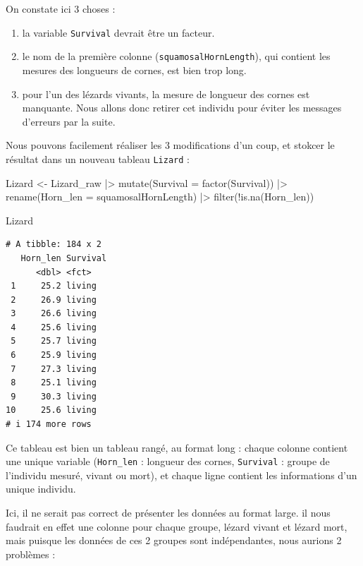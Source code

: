 \documentclass[
  french,
  a4paper,
  DIV=11,
  numbers=noendperiod,
  oneside]{scrreprt}
\newenvironment{Shaded}{}{}
\newcommand{\AttributeTok}[1]{\textcolor[rgb]{0.84,0.23,0.29}{#1}}
\newcommand{\FunctionTok}[1]{\textcolor[rgb]{0.44,0.26,0.76}{#1}}
\newcommand{\NormalTok}[1]{\textcolor[rgb]{0.14,0.16,0.18}{#1}}
\newcommand{\OtherTok}[1]{\textcolor[rgb]{0.44,0.26,0.76}{#1}}
\newcommand{\SpecialCharTok}[1]{\textcolor[rgb]{0.00,0.36,0.77}{#1}}
\providecommand{\tightlist}{%
  \setlength{\itemsep}{0pt}\setlength{\parskip}{0pt}}
\begin{document}
On constate ici 3 choses :

\begin{enumerate}
\def\labelenumi{\arabic{enumi}.}
\tightlist
\item
  la variable \texttt{Survival} devrait être un facteur.
\item
  le nom de la première colonne (\texttt{squamosalHornLength}), qui
  contient les mesures des longueurs de cornes, est bien trop long.
\item
  pour l'un des lézards vivants, la mesure de longueur des cornes est
  manquante. Nous allons donc retirer cet individu pour éviter les
  messages d'erreurs par la suite.
\end{enumerate}

Nous pouvons facilement réaliser les 3 modifications d'un coup, et
stokcer le résultat dans un nouveau tableau \texttt{Lizard} :

\begin{Shaded}
\begin{Highlighting}[]
\NormalTok{Lizard }\OtherTok{\textless{}{-}}\NormalTok{ Lizard\_raw }\SpecialCharTok{|\textgreater{}}
  \FunctionTok{mutate}\NormalTok{(}\AttributeTok{Survival =} \FunctionTok{factor}\NormalTok{(Survival)) }\SpecialCharTok{|\textgreater{}}
  \FunctionTok{rename}\NormalTok{(}\AttributeTok{Horn\_len =}\NormalTok{ squamosalHornLength) }\SpecialCharTok{|\textgreater{}}
  \FunctionTok{filter}\NormalTok{(}\SpecialCharTok{!}\FunctionTok{is.na}\NormalTok{(Horn\_len))}

\NormalTok{Lizard}
\end{Highlighting}
\end{Shaded}

\begin{verbatim}
# A tibble: 184 x 2
   Horn_len Survival
      <dbl> <fct>   
 1     25.2 living  
 2     26.9 living  
 3     26.6 living  
 4     25.6 living  
 5     25.7 living  
 6     25.9 living  
 7     27.3 living  
 8     25.1 living  
 9     30.3 living  
10     25.6 living  
# i 174 more rows
\end{verbatim}

Ce tableau est bien un tableau rangé, au format long : chaque colonne
contient une unique variable (\texttt{Horn\_len} : longueur des cornes,
\texttt{Survival} : groupe de l'individu mesuré, vivant ou mort), et
chaque ligne contient les informations d'un unique individu.

Ici, il ne serait pas correct de présenter les données au format large.
il nous faudrait en effet une colonne pour chaque groupe, lézard vivant
et lézard mort, mais puisque les données de ces 2 groupes sont
indépendantes, nous aurions 2 problèmes :
\end{document}
